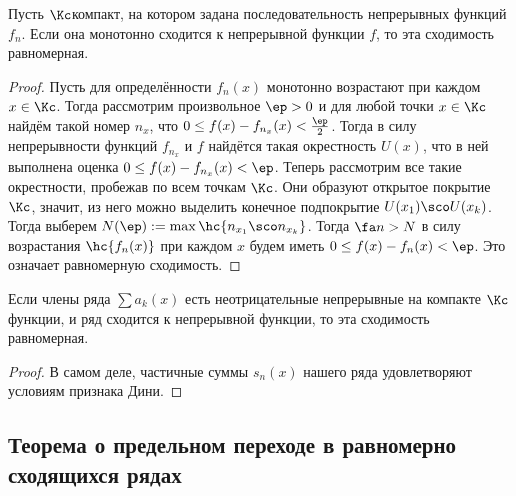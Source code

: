 \documentclass[a4paper]{article}
\begin{document}
\begin{theorem}
Пусть $\Kc$\т компакт, на котором задана последовательность непрерывных функций $f_n$. Если она монотонно сходится к
непрерывной функции $f$, то эта сходимость равномерная.
\end{theorem}
\begin{proof}
Пусть для определённости $f_n(x)$ монотонно возрастают при каждом $x \in \Kc$. Тогда рассмотрим произвольное $\ep > 0$ и для любой точки
$x \in \Kc$ найдём такой номер $n_x$, что $0 \le f(x)-f_{n_x}(x) < \frac{\ep}{2}$. Тогда в силу непрерывности функций $f_{n_x}$ и $f$
найдётся такая окрестность $U(x)$, что в ней выполнена оценка $0 \le f(x)-f_{n_x}(x) < \ep$. Теперь рассмотрим все такие окрестности,
пробежав по всем точкам $\Kc$. Они образуют открытое покрытие $\Kc$, значит, из него можно выделить конечное
подпокрытие $U(x_1)\sco U(x_k)$. Тогда выберем $N(\ep) := \max \hc{n_{x_1}\sco n_{x_k}}$. Тогда $\fa n>N$ в силу возрастания
$\hc{f_n(x)}$ при каждом $x$ будем иметь $0 \le f(x) - f_n(x) < \ep$. Это означает равномерную сходимость.
\end{proof}

\begin{theorem}
Если члены ряда $\sum a_k(x)$ есть неотрицательные непрерывные на компакте $\Kc$ функции, и ряд сходится
к непрерывной функции, то эта сходимость равномерная.
\end{theorem}
\begin{proof}
В самом деле, частичные суммы $s_n(x)$ нашего ряда удовлетворяют условиям признака Дини.
\end{proof}

\subsection{Теорема о предельном переходе в равномерно сходящихся рядах}
\end{document}

